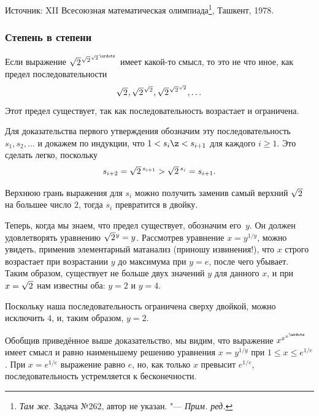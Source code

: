 \documentclass[twoside]{book}
\newcommand\VsMO{\emph{Н.~Б.~Васильев, А.~А.~Егоров}. Задачи Всесоюзных математических олимпиад. М.: Наука, 1988}
\begin{document}
\medskip

{%

Источник:
XII Всесоюзная математическая олимпиада\footnote{%
\emph{Там же}. Задача №262, автор не указан. "--- \emph{Прим. ред.}}, Ташкент, 1978.%

}


\subsubsection*{Степень в степени} %

Если выражение
${\textstyle\sqrt{2\mkern1mu}}{}^{{\sqrt{2\mkern1mu}}{}^{{\sqrt{2\mkern1mu}}^{\mkern2mu\urdots}}}$
имеет какой-то смысл, то это не что иное, как предел последовательности
$${\textstyle\sqrt{2\mkern1mu}}, {\textstyle\sqrt{2\mkern1mu}}{}^{{\sqrt{2\mkern1mu}}}, {\textstyle\sqrt{2\mkern1mu}}{}^{{\sqrt{2\mkern1mu}}{}^{{\sqrt{2\mkern1mu}}}},\dots$$
Этот предел существует, так как последовательность возрастает и ограничена.

Для доказательства первого утверждения обозначим эту последовательность
$s_1, s_2,\dots$ и докажем по индукции, что $1<s_i\z<s_{i+1}$
для каждого $i\ge 1$.
Это сделать легко, поскольку \[s_{i+2}=
{\textstyle\sqrt{2\mkern1mu}\mkern2mu}{}^{s_{i+1}}
>{\textstyle\sqrt{2\mkern1mu}\mkern2mu}{} ^{s_{i}}
=s_{i+1}.\]

Верхнюю грань выражения для $s_i$ можно получить заменив самый верхний $\sqrt{2\mkern1mu}$ на большее число $2$, тогда $s_i$ превратится в двойку.

Теперь, когда мы знаем, что предел существует, обозначим его~$y$.
Он должен удовлетворять уравнению ${\sqrt{2\mkern1mu}}{}^y=y$.
Рассмотрев уравнение $x=y^{1/y}$, 
можно увидеть, применив элементарный матанализ (приношу извинения!),
что $x$ строго возрастает при возрастании $y$ до максимума при $y=e$, после чего убывает.
Таким образом, существует не больше двух значений $y$ для данного $x$, 
и при $x=\sqrt{2\mkern1mu}$ нам известны оба: $y=2$ и $y=4$.

Поскольку наша последовательность ограничена сверху двойкой, можно исключить $4$, и, таким образом, $y=2$.\heart

\medskip

Обобщив приведённое выше доказательство, мы видим, что выражение $x^{x^{x^{\urdots}}}$
имеет смысл и равно наименьшему решению уравнения $x=y^{1/y}$ при $1\le x\le e^{1/e}$.
При $x=e^{1/e}$ выражение равно $e$, но, как только $x$ превысит $e^{1/e}$, последовательность устремляется к бесконечности.
\end{document}
